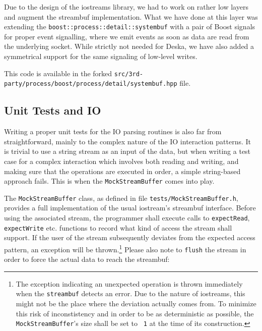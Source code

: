 \documentclass[deska]{subfiles}
\begin{document}
Due to the design of the iostreams library, we had to work on rather low layers and augment the streambuf
implementation.  What we have done at this layer was extending the {\tt boost::process::detail::systembuf} with a pair
of Boost signals for proper event signalling, where we emit events as soon as data are read from the underlying socket.
While strictly not needed for Deska, we have also added a symmetrical support for the same signaling of low-level
writes.

This code is available in the forked {\tt src/3rd-party/process/boost/process/detail/systembuf.hpp} file.

\subsection{Unit Tests and IO}

Writing a proper unit tests for the IO parsing routines is also far from straightforward, mainly to the complex nature
of the IO interaction patterns.  It is trivial to use a string stream as an input of the data, but when writing a test
case for a complex interaction which involves both reading and writing, and making sure that the operations are executed
in order, a simple string-based approach fails.  This is when the {\tt MockStreamBuffer} comes into play.

The {\tt MockStreamBuffer} class, as defined in file {\tt tests/MockStreamBuffer.h}, provides a full implementation of
the usual iostream's streambuf interface.  Before using the associated stream, the programmer shall execute calls to
{\tt expectRead}, {\tt expectWrite} etc. functions to record what kind of access the stream shall support.  If the user
of the stream subsequently deviates from the expected access pattern, an exception will be thrown.\footnote{The exception
indicating an unexpected operation is thrown immediately when the {\tt streambuf} detects an error.  Due to the nature
of iostreams, this might not be the place where the deviation actually comes from.  To minimize this risk of
inconstistency and in order to be as deterministic as possible, the {\tt MockStreamBuffer}'s size shall be set to {\tt
1} at the time of its construction.}  Please also note to {\tt flush} the stream in order to force the actual data to
reach the streambuf:
\end{document}
